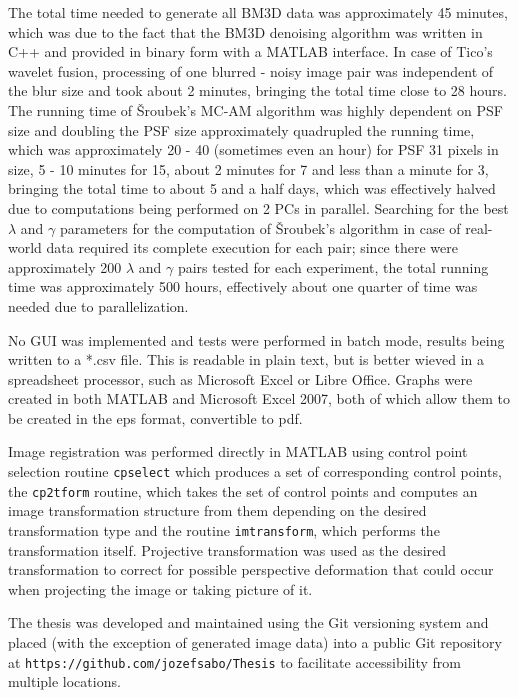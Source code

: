\documentclass[12pt,notitlepage]{report}
\begin{document}
The total time needed to generate all BM3D data was approximately 45 minutes, which was due to the fact that the BM3D denoising algorithm was written in C++ and provided in binary form with a MATLAB interface. In case of Tico's wavelet fusion, processing of one blurred - noisy image pair was independent of the blur size and took about 2 minutes, bringing the total time close to 28 hours. The running time of Šroubek's MC-AM algorithm was highly dependent on PSF size and doubling the PSF size approximately quadrupled the running time, which was approximately 20 - 40 (sometimes even an hour) for PSF 31 pixels in size, 5 - 10 minutes for 15, about 2 minutes for 7 and less than a minute for 3, bringing the total time to about 5 and a half days, which was effectively halved due to computations being performed on 2 PCs in parallel. Searching for the best $\lambda$ and $\gamma$ parameters for the computation of Šroubek's algorithm in case of real-world data required its complete execution for each pair; since there were approximately 200 $\lambda$ and $\gamma$ pairs tested for each experiment, the total running time was approximately 500 hours, effectively about one quarter of time was needed due to parallelization.  

No GUI was implemented and tests were performed in batch mode, results being written to a *.csv file. This is readable in plain text, but is better wieved in a spreadsheet processor, such as Microsoft Excel or Libre Office. Graphs were created in both MATLAB and Microsoft Excel 2007, both of which allow them to be created in the eps format, convertible to pdf. 

Image registration was performed directly in MATLAB using control point selection routine \texttt{cpselect} which produces a set of corresponding control points, the \texttt{cp2tform} routine, which takes the set of control points and computes an image transformation structure from them depending on the desired transformation type and the routine \texttt{imtransform}, which performs the transformation itself. Projective transformation was used as the desired transformation to correct for possible perspective deformation that could occur when projecting the image or taking picture of it.  

The thesis was developed and maintained using the Git versioning system and placed (with the exception of generated image data) into a public Git repository at \texttt{https://github.com/jozefsabo/Thesis} to facilitate accessibility from multiple locations.
\end{document}

